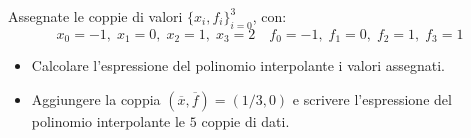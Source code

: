 Assegnate le coppie di valori $\{x_i,f_i \}_{i=0}^3$, con:
\[
x_0=-1, \; x_1=0, \; x_2=1,\; x_3=2 \quad f_0=-1, \; f_1=0, \;
f_2=1,\; f_3=1
\]
\begin{itemize}
\item  Calcolare l'espressione del polinomio interpolante i
valori assegnati.
\item
Aggiungere la coppia $(\overline{x},\overline{f})=(1/3,0)$ e
scrivere l'espressione del polinomio interpolante le $5$ coppie di
dati.

\end{itemize}
